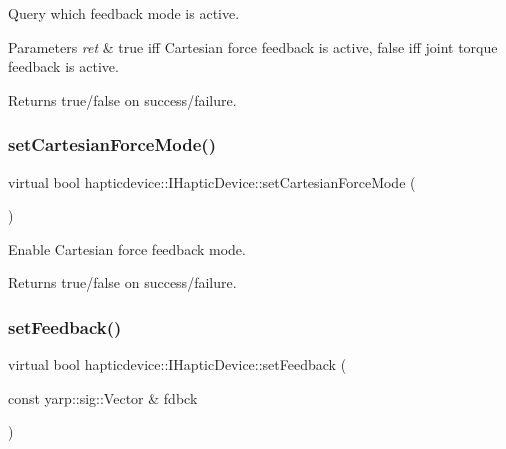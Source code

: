Query which feedback mode is active. 


\begin{DoxyParams}{Parameters}
{\em ret} & true iff Cartesian force feedback is active, false iff joint torque feedback is active. \\
\hline
\end{DoxyParams}
\begin{DoxyReturn}{Returns}
true/false on success/failure. 
\end{DoxyReturn}
\label{classhapticdevice_1_1IHapticDevice_a8b986f4c5d7bec42524c590c958ce37d} 
\subsubsection{\texorpdfstring{set\+Cartesian\+Force\+Mode()}{setCartesianForceMode()}}
{\footnotesize\ttfamily virtual bool hapticdevice\+::\+I\+Haptic\+Device\+::set\+Cartesian\+Force\+Mode (\begin{DoxyParamCaption}{ }\end{DoxyParamCaption})\hspace{0.3cm}{\ttfamily [pure virtual]}}



Enable Cartesian force feedback mode. 

\begin{DoxyReturn}{Returns}
true/false on success/failure. 
\end{DoxyReturn}
\label{classhapticdevice_1_1IHapticDevice_a77685dcf029136b739ae54ed8045e220} 
\subsubsection{\texorpdfstring{set\+Feedback()}{setFeedback()}}
{\footnotesize\ttfamily virtual bool hapticdevice\+::\+I\+Haptic\+Device\+::set\+Feedback (\begin{DoxyParamCaption}\item[{const yarp\+::sig\+::\+Vector \&}]{fdbck }\end{DoxyParamCaption})\hspace{0.3cm}{\ttfamily [pure virtual]}}



